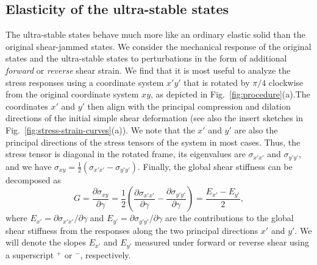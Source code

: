 \documentclass[twocolumn,showkeys,superscriptaddress,preprintnumbers,amsmath,amssymb,showpacs,prx,longbibliography]{revtex4-2}
\begin{document}
\begin{CJK*}{UTF8}{gbsn}
\subsection{Elasticity of the ultra-stable states}

The ultra-stable states behave much more like an ordinary elastic 
solid than the original 
shear-jammed states. We consider the mechanical response of the original states and the ultra-stable states to perturbations in the form of additional {\it forward} or {\it reverse} shear strain. We find that it is most useful to analyze the stress responses using a coordinate system $x'y'$ that is rotated by $\pi/4$ clockwise from the original coordinate system $xy$, as depicted in Fig.~\ref{fig:procedure}(a).The coordinates $x'$ and $y'$ then align with the principal compression and dilation directions of the initial simple shear deformation (see also the insert sketches in Fig.~\ref{fig:stress-strain-curves}(a)). We note that the $x'$ and $y'$ are also the principal directions of the stress tensors of the system in most cases. Thus, the stress tensor is diagonal in the rotated frame, its eigenvalues are $\sigma_{x'x'}$ and $\sigma_{y'y'}$, and we have $\sigma_{xy} = \frac{1}{2}(\sigma_{x'x'}-\sigma_{y'y'})$. Finally, the global shear stiffness can be decomposed as 
\begin{equation}\label{eq:slope_def}
    G = \frac{\partial  \sigma_{xy}}{\partial \gamma} = \frac{1}{2}\left(\frac{\partial \sigma_{x'x'}}{\partial \gamma} - \frac{\partial \sigma_{y'y'}}{\partial \gamma}\right) =\frac{E_{x'}-E_{y'}}{2},
\end{equation} 
where $E_{x'}= \partial \sigma_{x'x'}/\partial \gamma$ and $E_{y'}=\partial \sigma_{y'y'}/\partial \gamma$ are the contributions to the global shear stiffness from the responses along the two principal directions $x'$ and $y'$. We will denote the slopes $E_{x'}$ and $E_{y'}$ measured under forward or reverse shear using a superscript $^+$ or $^-$, respectively.




\end{CJK*}
\end{document}
